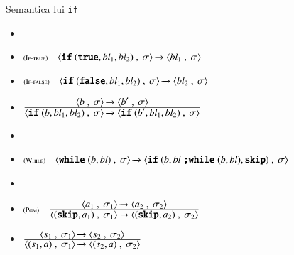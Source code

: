 \documentclass[xcolor=pdftex,romanian,colorlinks]{beamer}
\begin{document}
\begin{frame}[fragile]{Semantica lui \texttt{if}}
\vspace*{0.5cm}
 
 
    \begin{itemize}
  \item {} 
 \item[]
  $\reg[If-true]{\Ss{\Conf{\Sif (\terminal{true},{\it bl}_1, {\it bl}_2)}{\sigma}}  {\Conf{{\it bl}_1}{\sigma}}}{}{}$
   
  \item[]
  $\reg[If-false]{\Ss{\Conf{\Sif (\terminal{false},{\it bl}_1,{\it bl}_2)}{\sigma}}  {\Conf{{\it bl}_2}{\sigma}}}{}{}$
   \medskip   
  \item[]
  $\reg{
   \Ss{\Conf{\Sif ({b},{\it bl}_1, {\it bl}_2)}{\sigma}}  {\Conf{\Sif ({b'}, {\it bl}_1, {\it bl}_2)}{\sigma}}
  }{
    \Ss{\Conf{b}{\sigma}}  {\Conf{b'}{\sigma}}
  }
  {}$
  
\vspace{.4cm}
  \item {} 
  \vspace{-.4cm}
  \item[] \mbox{$\reg[While]{
   \Ss{\Conf{\Swhile ({b},{\it bl})}{\sigma}}  {\Conf{\Sif({b},  {\it bl}\terminal{;}\Swhile({b},{\it bl}),\terminal{skip})}{\sigma}}
  }{}
  {}$}

\vspace{.4cm}
  \item {} 
  \vspace{.2cm}
  \item[] $\reg[Pgm]{\Ss{\Conf{(\terminal{skip}, a_1)}{\sigma_1}}  {\Conf{(\terminal{skip}, a_2)}{\sigma_2}}}{\Ss{\Conf{a_1}{\sigma_1}}  {\Conf{a_2}{\sigma_2}}}{}$

\vspace{.2cm}
 \item[] \hspace*{0.6cm}$\reg{\Ss{\Conf{(s_1, a)}{\sigma_1}}  {\Conf{(s_2, a)}{\sigma_2}}}{\Ss{\Conf{s_1}{\sigma_1}}  {\Conf{s_2}{\sigma_2}}}{}$  

  
  
\end{itemize}
 

  \end{frame} 
 
\end{document}
